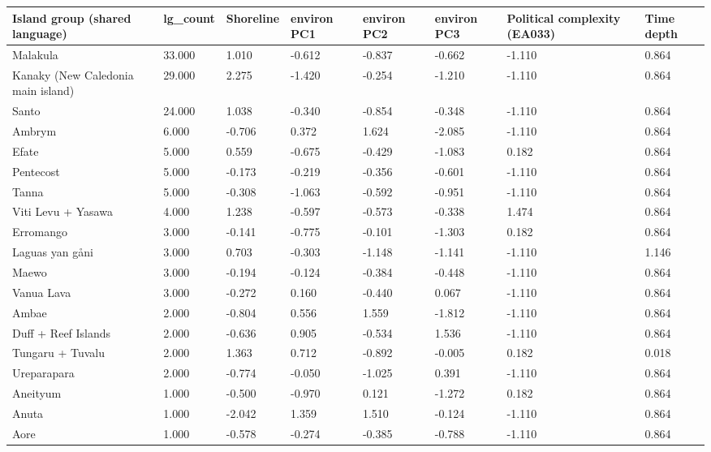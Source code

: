 \begin{longtable}{p{4.5cm}p{1.7cm}p{1.7cm}p{1.7cm}p{1.7cm}p{1.7cm}p{1.7cm}p{1.7cm}}
  \toprule
Island group (shared language) & lg_count & Shoreline & environ PC1 & environ PC2 & environ PC3 & Political complexity (EA033) & Time depth \\ 
  \midrule
Malakula & 33.000 & 1.010 & -0.612 & -0.837 & -0.662 & -1.110 & 0.864 \\ 
  Kanaky (New Caledonia main island) & 29.000 & 2.275 & -1.420 & -0.254 & -1.210 & -1.110 & 0.864 \\ 
  Santo & 24.000 & 1.038 & -0.340 & -0.854 & -0.348 & -1.110 & 0.864 \\ 
  Ambrym & 6.000 & -0.706 & 0.372 & 1.624 & -2.085 & -1.110 & 0.864 \\ 
  Efate & 5.000 & 0.559 & -0.675 & -0.429 & -1.083 & 0.182 & 0.864 \\ 
  Pentecost & 5.000 & -0.173 & -0.219 & -0.356 & -0.601 & -1.110 & 0.864 \\ 
  Tanna & 5.000 & -0.308 & -1.063 & -0.592 & -0.951 & -1.110 & 0.864 \\ 
  Viti Levu + Yasawa & 4.000 & 1.238 & -0.597 & -0.573 & -0.338 & 1.474 & 0.864 \\ 
  Erromango & 3.000 & -0.141 & -0.775 & -0.101 & -1.303 & 0.182 & 0.864 \\ 
  Laguas yan gåni & 3.000 & 0.703 & -0.303 & -1.148 & -1.141 & -1.110 & 1.146 \\ 
  Maewo & 3.000 & -0.194 & -0.124 & -0.384 & -0.448 & -1.110 & 0.864 \\ 
  Vanua Lava & 3.000 & -0.272 & 0.160 & -0.440 & 0.067 & -1.110 & 0.864 \\ 
  Ambae & 2.000 & -0.804 & 0.556 & 1.559 & -1.812 & -1.110 & 0.864 \\ 
  Duff + Reef Islands & 2.000 & -0.636 & 0.905 & -0.534 & 1.536 & -1.110 & 0.864 \\ 
  Tungaru + Tuvalu & 2.000 & 1.363 & 0.712 & -0.892 & -0.005 & 0.182 & 0.018 \\ 
  Ureparapara & 2.000 & -0.774 & -0.050 & -1.025 & 0.391 & -1.110 & 0.864 \\ 
  Aneityum & 1.000 & -0.500 & -0.970 & 0.121 & -1.272 & 0.182 & 0.864 \\ 
  Anuta & 1.000 & -2.042 & 1.359 & 1.510 & -0.124 & -1.110 & 0.864 \\ 
  Aore & 1.000 & -0.578 & -0.274 & -0.385 & -0.788 & -1.110 & 0.864 \\ 

\end{longtable}
